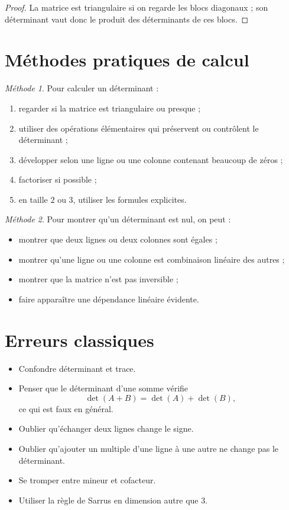 \documentclass[11pt,a4paper]{article}
\theoremstyle{remark}
\newtheorem*{methode}{Méthode}
\begin{document}
\begin{proof}
La matrice est triangulaire si on regarde les blocs diagonaux ; son déterminant vaut donc le produit des déterminants de ces blocs.
\end{proof}

\section{Méthodes pratiques de calcul}

\begin{methode}
Pour calculer un déterminant :
\begin{enumerate}
    \item regarder si la matrice est triangulaire ou presque ;
    \item utiliser des opérations élémentaires qui préservent ou contrôlent le déterminant ;
    \item développer selon une ligne ou une colonne contenant beaucoup de zéros ;
    \item factoriser si possible ;
    \item en taille \(2\) ou \(3\), utiliser les formules explicites.
\end{enumerate}
\end{methode}

\begin{methode}
Pour montrer qu’un déterminant est nul, on peut :
\begin{itemize}
    \item montrer que deux lignes ou deux colonnes sont égales ;
    \item montrer qu’une ligne ou une colonne est combinaison linéaire des autres ;
    \item montrer que la matrice n’est pas inversible ;
    \item faire apparaître une dépendance linéaire évidente.
\end{itemize}
\end{methode}

\section{Erreurs classiques}

\begin{itemize}
    \item Confondre déterminant et trace.
    \item Penser que le déterminant d’une somme vérifie
    \[
    \det(A+B)=\det(A)+\det(B),
    \]
    ce qui est faux en général.
    \item Oublier qu’échanger deux lignes change le signe.
    \item Oublier qu’ajouter un multiple d’une ligne à une autre ne change pas le déterminant.
    \item Se tromper entre mineur et cofacteur.
    \item Utiliser la règle de Sarrus en dimension autre que \(3\).
\end{itemize}
\end{document}
